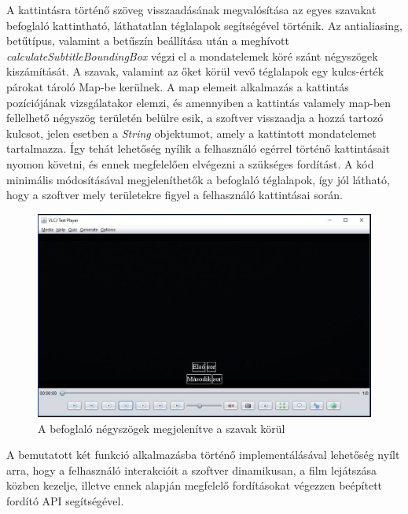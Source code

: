 A kattintásra történő szöveg visszaadásának megvalósítása az egyes szavakat befoglaló kattintható, láthatatlan téglalapok segítségével történik. Az antialiasing, betűtípus, valamint a betűszín beállítása után a meghívott \textit{calculateSubtitleBoundingBox} végzi el a mondatelemek köré szánt négyszögek kiszámítását. A szavak, valamint az őket körül vevő téglalapok egy kulcs-érték párokat tároló Map-be kerülnek. A map elemeit alkalmazás a kattintás pozíciójának vizsgálatakor elemzi, és amennyiben a kattintás valamely map-ben fellelhető négyszög területén belülre esik, a szoftver visszaadja a hozzá tartozó kulcsot, jelen esetben a \textit{String} objektumot, amely a kattintott mondatelemet tartalmazza. Így tehát lehetőség nyílik a felhasználó egérrel történő kattintásait nyomon követni, és ennek megfelelően elvégezni a szükséges fordítást. A kód minimális módosításával megjeleníthetők a befoglaló téglalapok, így jól látható, hogy a szoftver mely területekre figyel a felhasználó kattintásai során.
\begin{figure}
  \includegraphics[width=\linewidth]{images/subtitle_boxes.jpg}
  \caption{A befoglaló négyszögek megjelenítve a szavak körül}
  \label{fig:full_screen}
\end{figure}
A bemutatott két funkció alkalmazásba történő implementálásával lehetőség nyílt arra, hogy a felhasználó interakcióit a szoftver dinamikusan, a film lejátszása közben kezelje, illetve ennek alapján megfelelő fordításokat végezzen beépített fordító API segítségével.

